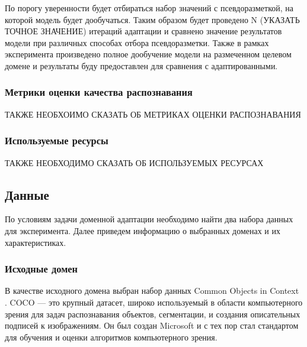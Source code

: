 По порогу уверенности будет отбираться набор значений с псевдоразметкой, на которой модель будет дообучаться. Таким образом будет проведено N (УКАЗАТЬ ТОЧНОЕ ЗНАЧЕНИЕ) итераций адаптации и сравнено значение результатов модели при различных способах отбора псевдоразметки. Также в рамках эксперимента произведено полное дообучение модели на размеченном целевом домене и результаты буду предоставлен для сравнения с адаптированными.

\subsubsection*{Метрики оценки качества распознавания}

ТАКЖЕ НЕОБХОИМО СКАЗАТЬ ОБ МЕТРИКАХ ОЦЕНКИ РАСПОЗНАВАНИЯ

\subsubsection*{Используемые ресурсы}

ТАКЖЕ НЕОБХОДИМО СКАЗАТЬ ОБ ИСПОЛЬЗУЕМЫХ РЕСУРСАХ


\subsection{Данные}

По условиям задачи доменной адаптации необходимо найти два набора данных для эксперимента. Далее приведем информацию о выбранных доменах и их характеристиках.

\subsubsection*{Исходные домен}


В качестве исходного домена выбран набор данных Common Objects in Context \cite{COCO_dataset}. COCO — это крупный датасет, широко используемый в области компьютерного зрения для задач распознавания объектов, сегментации, и создания описательных подписей к изображениям. Он был создан Microsoft и с тех пор стал стандартом для обучения и оценки алгоритмов компьютерного зрения.

